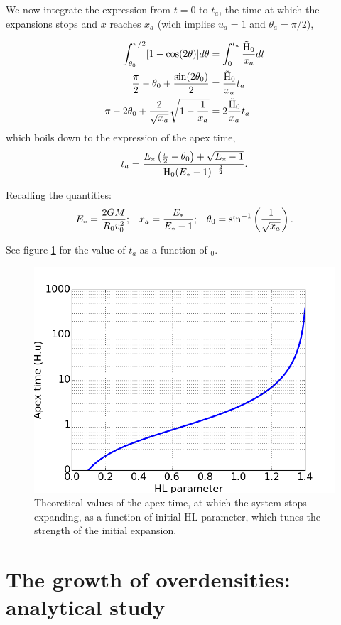 We now integrate the expression from $t=0$ to $t_a$, the time at which the expansions stops and $x$ reaches $x_a$ (wich implies $u_a = 1$ and $\theta_a = \pi /2$), 

\begin{align}
\int^{\pi/2}_{\theta_0} [ 1 - \cos(2\theta)]d\theta  & = \int^{t_a}_0 \frac{\tilde{{\textrm{H}}}_0}{x_a} dt\\
\frac{\pi}{2} - \theta_0 + \frac{\sin(2\theta_0)}{2} & =  \frac{\tilde{{\textrm{H}}}_0}{x_a} t_a\\
\pi - 2 \theta_0 + \frac{2}{\sqrt{x_a}}\sqrt{1-\frac{1}{x_a}} & = 2 \frac{\tilde{{\textrm{H}}}_0}{x_a} t_a 
\end{align}
which boils down to the expression of the apex time,
\begin{equation}
t_a = \frac{E_\ast \left(\frac{\pi}{2} - \theta_0\right) + \sqrt{E_\ast-1}}{{\textrm{H}}_0 (E_\ast-1)^{-\frac{3}{2}}}.
\end{equation}

Recalling the quantities:
\begin{align}
E_\ast = \frac{2GM}{R_0 v_0^2}        &;  & x_a=\frac{E_\ast}{E_\ast-1}  &;  &\theta_0 = \sin^{-1}\left(\frac{1}{\sqrt{x_a}}\right).  
\end{align}

See figure \ref{Fig:apextime} for the value of $t_a$ as a function of \Hub$_0$.

\begin{figure}
\center
\includegraphics[width=0.7\linewidth]{Figures/1_apextime.png}
\caption{Theoretical values of the apex time, at which the system stops expanding, as a function of initial HL parameter, which tunes the strength of the initial expansion.}
\label{Fig:apextime}
\end{figure} 





\section{The growth of overdensities: analytical study}



